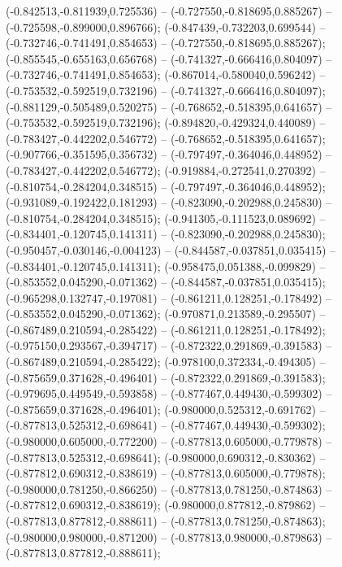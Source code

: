  (-0.842513,-0.811939,0.725536) -- (-0.727550,-0.818695,0.885267) -- (-0.725598,-0.899000,0.896766);
 (-0.847439,-0.732203,0.699544) -- (-0.732746,-0.741491,0.854653) -- (-0.727550,-0.818695,0.885267);
 (-0.855545,-0.655163,0.656768) -- (-0.741327,-0.666416,0.804097) -- (-0.732746,-0.741491,0.854653);
 (-0.867014,-0.580040,0.596242) -- (-0.753532,-0.592519,0.732196) -- (-0.741327,-0.666416,0.804097);
 (-0.881129,-0.505489,0.520275) -- (-0.768652,-0.518395,0.641657) -- (-0.753532,-0.592519,0.732196);
 (-0.894820,-0.429324,0.440089) -- (-0.783427,-0.442202,0.546772) -- (-0.768652,-0.518395,0.641657);
 (-0.907766,-0.351595,0.356732) -- (-0.797497,-0.364046,0.448952) -- (-0.783427,-0.442202,0.546772);
 (-0.919884,-0.272541,0.270392) -- (-0.810754,-0.284204,0.348515) -- (-0.797497,-0.364046,0.448952);
 (-0.931089,-0.192422,0.181293) -- (-0.823090,-0.202988,0.245830) -- (-0.810754,-0.284204,0.348515);
 (-0.941305,-0.111523,0.089692) -- (-0.834401,-0.120745,0.141311) -- (-0.823090,-0.202988,0.245830);
 (-0.950457,-0.030146,-0.004123) -- (-0.844587,-0.037851,0.035415) -- (-0.834401,-0.120745,0.141311);
 (-0.958475,0.051388,-0.099829) -- (-0.853552,0.045290,-0.071362) -- (-0.844587,-0.037851,0.035415);
 (-0.965298,0.132747,-0.197081) -- (-0.861211,0.128251,-0.178492) -- (-0.853552,0.045290,-0.071362);
 (-0.970871,0.213589,-0.295507) -- (-0.867489,0.210594,-0.285422) -- (-0.861211,0.128251,-0.178492);
 (-0.975150,0.293567,-0.394717) -- (-0.872322,0.291869,-0.391583) -- (-0.867489,0.210594,-0.285422);
 (-0.978100,0.372334,-0.494305) -- (-0.875659,0.371628,-0.496401) -- (-0.872322,0.291869,-0.391583);
 (-0.979695,0.449549,-0.593858) -- (-0.877467,0.449430,-0.599302) -- (-0.875659,0.371628,-0.496401);
 (-0.980000,0.525312,-0.691762) -- (-0.877813,0.525312,-0.698641) -- (-0.877467,0.449430,-0.599302);
 (-0.980000,0.605000,-0.772200) -- (-0.877813,0.605000,-0.779878) -- (-0.877813,0.525312,-0.698641);
 (-0.980000,0.690312,-0.830362) -- (-0.877812,0.690312,-0.838619) -- (-0.877813,0.605000,-0.779878);
 (-0.980000,0.781250,-0.866250) -- (-0.877813,0.781250,-0.874863) -- (-0.877812,0.690312,-0.838619);
 (-0.980000,0.877812,-0.879862) -- (-0.877813,0.877812,-0.888611) -- (-0.877813,0.781250,-0.874863);
 (-0.980000,0.980000,-0.871200) -- (-0.877813,0.980000,-0.879863) -- (-0.877813,0.877812,-0.888611);

